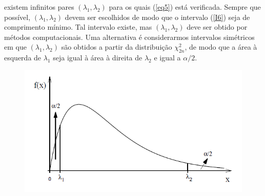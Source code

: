 \documentclass[12pt]{beamer}
\begin{document}
\begin{frame}{}
\begin{block}{}
\justifying
existem infinitos pares $(\lambda_1, \lambda_2)$ para os quais (\ref{eq5}) está verificada. Sempre que possível, $(\lambda_1, \lambda_2)$ devem ser escolhidos de modo que o intervalo (\ref{I6}) seja de comprimento mínimo. Tal intervalo existe, mas $(\lambda_1, \lambda_2)$ deve ser obtido por métodos computacionais. Uma alternativa é considerarmos intervalos simétricos em que $(\lambda_1, \lambda_2)$ são obtidos a partir da distribuição $\chi^2_{2n}$, de modo que a área à esquerda de $\lambda_1$ seja igual à área à direita de $\lambda_2$ e igual a $\alpha/2$.
\end{block}
\begin{figure}
    \centering
    \includegraphics[scale=0.6]{figs/ChiQuad.PNG}
    \label{fig:enter-label}
\end{figure}
\end{frame}
\end{document}
